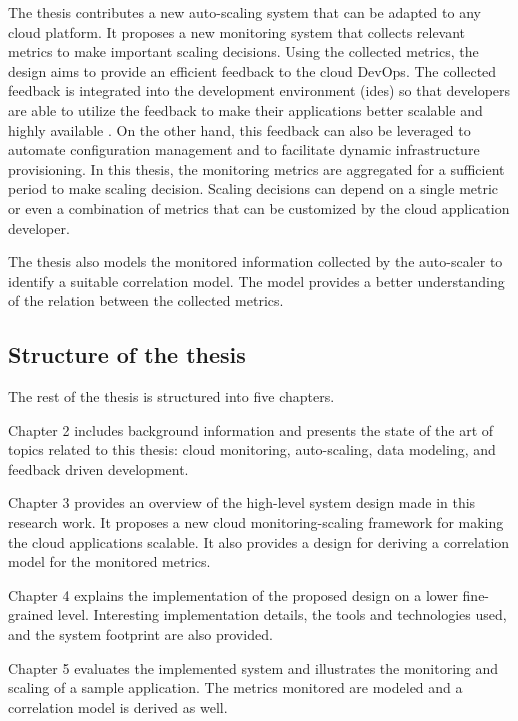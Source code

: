 \documentclass[article,type=msc,colorback,12pt,accentcolor=tud8b,table]{tudthesis}
\begin{document}
	The thesis contributes a new auto-scaling system that can be adapted to any cloud platform. It proposes a new monitoring system that collects relevant metrics to make important scaling decisions. Using the collected metrics, the design aims to provide an efficient feedback to the cloud DevOps. The collected feedback is integrated into the development environment (\gls{ide}s) so that developers are able to utilize the feedback to make their applications better scalable and highly available \cite{cito2015runtime}. On the other hand, this feedback can also be leveraged to automate configuration management and to facilitate dynamic infrastructure provisioning. In this thesis, the monitoring metrics are aggregated for a sufficient period to make scaling decision. Scaling decisions can depend on a single metric or even a combination of metrics that can be customized by the cloud application developer. 
	
	The thesis also models the monitored information collected by the auto-scaler to identify a suitable correlation model. The model provides a better understanding of the relation between the collected metrics. 
	
	\subsection{Structure of the thesis}

	\par The rest of the thesis is structured into five chapters.
	
	Chapter 2 includes background information and presents the state of the art of topics related to this thesis: cloud monitoring, auto-scaling, data modeling, and feedback driven development. 
	
	Chapter 3 provides an overview of the high-level system design made in this research work. It proposes a new cloud monitoring-scaling framework for making the cloud applications scalable. It also provides a design for deriving a correlation model for the monitored metrics.
	
	Chapter 4 explains the implementation of the proposed design on a lower fine-grained level. Interesting implementation details, the tools and technologies used,  and the system footprint are also provided.  
	
	Chapter 5 evaluates the implemented system and illustrates the monitoring and scaling of a sample application. The metrics monitored are modeled and a correlation model is derived as well. 
	
\end{document}
